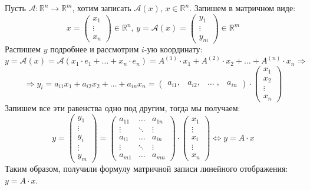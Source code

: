\documentclass[12pt]{article}
\newcommand{\MR}{\mathbb{R}}
\newcommand{\MA}{\mathcal{A}}
\theoremstyle{definition}
\begin{document}
Пусть $\MA \colon \MR^n \to \MR^m$, хотим записать $\MA(x), \, x \in \MR^n$. Запишем в матричном виде:
$$
	x = 
	\begin{pmatrix}
		x_1 \\
		\vdots \\ 
		x_n
	\end{pmatrix} \in \MR^n, \, y = \MA(x) = 
	\begin{pmatrix}
		y_1 \\
		\vdots \\
		y_m
	\end{pmatrix} \in \MR^m 
$$
Распишем $y$ подробнее и рассмотрим $i$-ую координату:
$$
	y = \MA(x) = \MA(x_1 {\cdot}e_1 + \dotsc + x_n {\cdot}e_n) = A^{(1)}{\cdot}x_1 + A^{(2)}{\cdot}x_2+ \dotsc + A^{(n)}{\cdot}x_n \Rightarrow
$$
$$
	\Rightarrow y_i = a_{i1}x_1 + a_{i2}x_2 + \dotsc + a_{in}x_n = \begin{pmatrix}
		a_{i1},& a_{i2},& \dotsc \; ,& a_{in}
	\end{pmatrix}{\cdot}
	\begin{pmatrix}
		x_1 \\
		x_2 \\
		\vdots\\
		x_n
	\end{pmatrix}
$$
Запишем все эти равенства одно под другим, тогда мы получаем:
$$
	y = 	
	\begin{pmatrix}
		y_1 \\
		\vdots \\
		y_{i}\\
		\vdots\\
		y_m
	\end{pmatrix} = 
	\begin{pmatrix}
		a_{11} & \dotsc & a_{1n} \\
		\vdots & \ddots & \vdots \\
		a_{i1} & \dotsc & a_{in}\\
		\vdots & \ddots & \vdots \\
		a_{m1} & \dotsc & a_{mn}
	\end{pmatrix}{\cdot}
	\begin{pmatrix}
		x_1 \\
			\vdots \\
		x_i \\
		\vdots\\
		x_n
	\end{pmatrix} \Leftrightarrow y = A{\cdot}x
$$
Таким образом, получили формулу матричной записи линейного отображения: $y = A{\cdot}x$.
\end{document}
